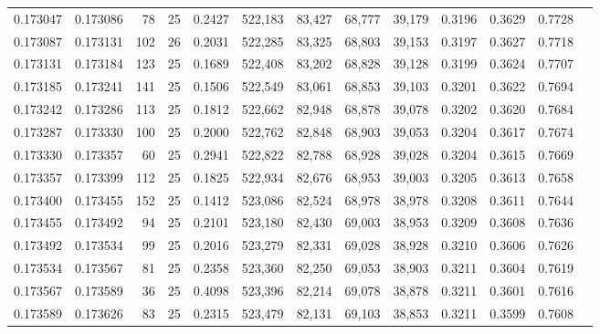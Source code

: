\begin{tabular}{rrrrrrrrrrrrr}
0.173047 & 0.173086 &    78 &  25 &                                     0.2427 & 522,183 &  83,427 &  68,777 &  39,179 & 0.3196 & 0.3629 & 0.7728 \\
0.173087 & 0.173131 &   102 &  26 &                                     0.2031 & 522,285 &  83,325 &  68,803 &  39,153 & 0.3197 & 0.3627 & 0.7718 \\
0.173131 & 0.173184 &   123 &  25 &                                     0.1689 & 522,408 &  83,202 &  68,828 &  39,128 & 0.3199 & 0.3624 & 0.7707 \\
0.173185 & 0.173241 &   141 &  25 &                                     0.1506 & 522,549 &  83,061 &  68,853 &  39,103 & 0.3201 & 0.3622 & 0.7694 \\
0.173242 & 0.173286 &   113 &  25 &                                     0.1812 & 522,662 &  82,948 &  68,878 &  39,078 & 0.3202 & 0.3620 & 0.7684 \\
0.173287 & 0.173330 &   100 &  25 &                                     0.2000 & 522,762 &  82,848 &  68,903 &  39,053 & 0.3204 & 0.3617 & 0.7674 \\
0.173330 & 0.173357 &    60 &  25 &                                     0.2941 & 522,822 &  82,788 &  68,928 &  39,028 & 0.3204 & 0.3615 & 0.7669 \\
0.173357 & 0.173399 &   112 &  25 &                                     0.1825 & 522,934 &  82,676 &  68,953 &  39,003 & 0.3205 & 0.3613 & 0.7658 \\
0.173400 & 0.173455 &   152 &  25 &                                     0.1412 & 523,086 &  82,524 &  68,978 &  38,978 & 0.3208 & 0.3611 & 0.7644 \\
0.173455 & 0.173492 &    94 &  25 &                                     0.2101 & 523,180 &  82,430 &  69,003 &  38,953 & 0.3209 & 0.3608 & 0.7636 \\
0.173492 & 0.173534 &    99 &  25 &                                     0.2016 & 523,279 &  82,331 &  69,028 &  38,928 & 0.3210 & 0.3606 & 0.7626 \\
0.173534 & 0.173567 &    81 &  25 &                                     0.2358 & 523,360 &  82,250 &  69,053 &  38,903 & 0.3211 & 0.3604 & 0.7619 \\
0.173567 & 0.173589 &    36 &  25 &                                     0.4098 & 523,396 &  82,214 &  69,078 &  38,878 & 0.3211 & 0.3601 & 0.7616 \\
0.173589 & 0.173626 &    83 &  25 &                                     0.2315 & 523,479 &  82,131 &  69,103 &  38,853 & 0.3211 & 0.3599 & 0.7608 \\

\end{tabular}
